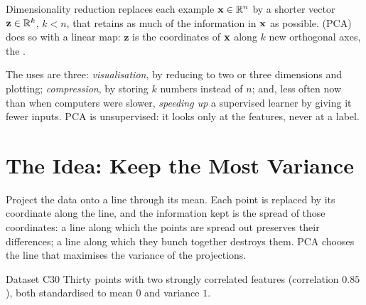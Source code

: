 \begin{defbox}{Dimensionality reduction}
 replaces each example $\mathbf{x} \in \mathbb{R}^{n}$ by a
shorter vector $\mathbf{z} \in \mathbb{R}^{k}$, $k < n$, that retains as much of the
information in $\mathbf{x}$ as possible.  (PCA) does
so with a linear map: $\mathbf{z}$ is the coordinates of $\mathbf{x}$ along $k$ new
orthogonal axes, the .
\end{defbox}

The uses are three: \emph{visualisation}, by reducing to two or three dimensions
and plotting; \emph{compression}, by storing $k$ numbers instead of $n$; and,
less often now than when computers were slower, \emph{speeding up} a supervised
learner by giving it fewer inputs. PCA is unsupervised: it looks only at the
features, never at a label.

\section{The Idea: Keep the Most Variance}
\label{sec:pca-idea}

Project the data onto a line through its mean. Each point is replaced by its
coordinate along the line, and the information kept is the spread of those
coordinates: a line along which the points are spread out preserves their
differences; a line along which they bunch together destroys them. PCA chooses
the line that maximises the variance of the projections.

\begin{defbox}{Dataset C30}
Thirty points with two strongly correlated features (correlation $0.85$), both
standardised to mean $0$ and variance $1$.
\end{defbox}

